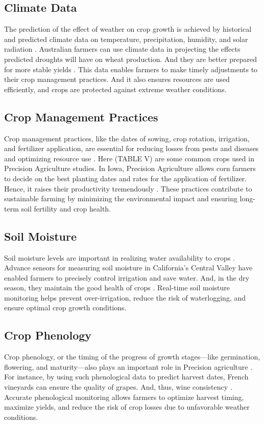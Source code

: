 \documentclass[conference]{IEEEtran}
\begin{document}
\subsection{Climate Data}\label{AA}
The prediction of the effect of weather on crop growth is achieved by historical and predicted climate data on temperature, precipitation, humidity, and solar radiation \cite{b52}. Australian farmers can use climate data in projecting the effects predicted droughts will have on wheat production. And they are better prepared for more stable yields \cite{b53}. This data enables farmers to make timely adjustments to their crop management practices. And it also ensures resources are used efficiently, and crops are protected against extreme weather conditions.

\subsection{Crop Management Practices}\label{AA}
Crop management practices, like the dates of sowing, crop rotation, irrigation, and fertilizer application, are essential for reducing losses from pests and diseases and optimizing resource use \cite{b54}. Here (TABLE V) are some common crops used in Precision Agriculture studies. In Iowa, Precision Agriculture allows corn farmers to decide on the best planting dates and rates for the application of fertilizer. Hence, it raises their productivity tremendously \cite{b55}. These practices contribute to sustainable farming by minimizing the environmental impact and ensuring long-term soil fertility and crop health.

\subsection{Soil Moisture}\label{AA}
Soil moisture levels are important in realizing water availability to crops \cite{b56}. Advance sensors for measuring soil moisture in California's Central Valley have enabled farmers to precisely control irrigation and save water. And, in the dry season, they maintain the good health of crops \cite{b57}. Real-time soil moisture monitoring helps prevent over-irrigation, reduce the risk of waterlogging, and ensure optimal crop growth conditions.

\subsection{Crop Phenology}\label{AA}
Crop phenology, or the timing of the progress of growth stages—like germination, flowering, and maturity—also plays an important role in Precision agriculture \cite{b58}. For instance, by using such phenological data to predict harvest dates, French vineyards can ensure the quality of grapes. And, thus, wine consistency \cite{b59}. Accurate phenological monitoring allows farmers to optimize harvest timing, maximize yields, and reduce the risk of crop losses due to unfavorable weather conditions.
\end{document}
